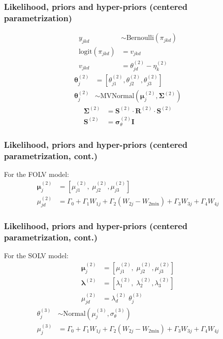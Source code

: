 \documentclass[arial,12pt,xcolor=dvipsnames]{beamer}
\begin{document}
%
\begin{frame}
	\frametitle{Likelihood, priors and hyper-priors
		(centered parametrization)}
	\begin{align}
		y_{jkd} &\sim \text{Bernoulli}( \pi_{jkd} ) \\
		\text{logit}( \pi_{jkd} ) &= v_{jkd} \\
		v_{jkd} &= \theta^{(2)}_{jd} - \eta^{(2)}_{k}
	\end{align}
	\begin{align}
		\boldsymbol{\theta}^{(2)}_{j} &= \left[ \theta_{j1}^{(2)}, \theta_{j2}^{(2)}, \theta_{j3}^{(2)} \right] \\
		\boldsymbol{\theta}^{(2)}_{j} &\sim \text{MVNormal} \left( \boldsymbol{\mu}^{(2)}_{j}, \boldsymbol{\Sigma}^{(2)} \right) \label{eq:theta_sub}
	\end{align}
	\begin{align} \label{eq:sigma_factoring}
		\boldsymbol{\Sigma}^{(2)} &= \boldsymbol{S}^{(2)} \cdot \boldsymbol{R}^{(2)} \cdot \boldsymbol{S}^{(2)} \\
		\boldsymbol{S}^{(2)} &= \pmb{\sigma}^{(2)}_{\theta} \mathbf{I}
	\end{align}
\end{frame}
%
\begin{frame}
	\frametitle{Likelihood, priors and hyper-priors
		(centered parametrization, cont.)}
	For the FOLV model:
	\begin{align}
		\boldsymbol{\mu}^{(2)}_{j} &= \left[ \mu^{(2)}_{j1}, \; \mu^{(2)}_{j2}, \mu^{(2)}_{j3} \right] \label{eq:mu_FOLV} \\
		\mu^{(2)}_{jd} &= \Gamma_{0} + \Gamma_{1} W_{1j} + \Gamma_{2} (W_{2j} - W_{2\text{min}}) + \Gamma_{3} W_{3j} + \Gamma_{4} W_{4j}
	\end{align}
\end{frame}
%
\begin{frame}
	\frametitle{Likelihood, priors and hyper-priors
		(centered parametrization, cont.)}
	For the SOLV model:
	\begin{align}
		\boldsymbol{\mu}^{(2)}_{j} &= \left[ \mu^{(2)}_{j1}, \; \mu^{(2)}_{j2}, \mu^{(2)}_{j3} \right] \\
		\pmb{\lambda}^{(2)} &= \left[ \lambda^{(2)}_{1}, \; \lambda^{(2)}_{2}, \lambda^{(2)}_{3} \right] \\
		\mu^{(2)}_{jd} &= \lambda^{(2)}_{d} \; \theta^{(3)}_{j} 
	\end{align}
	\begin{align}
		\theta^{(3)}_{j} &\sim \text{Normal} \left( \mu^{(3)}_{j}, \sigma^{(3)}_{\theta} \right) \label{eq:theta} \\
		\mu^{(3)}_{j} &=  \Gamma_{0} + \Gamma_{1} W_{1j} + \Gamma_{2} (W_{2j} - W_{2\text{min}}) + \Gamma_{3} W_{3j} + \Gamma_{4} W_{4j} \label{eq:mu_SOLV}
	\end{align}
\end{frame}
\end{document}
